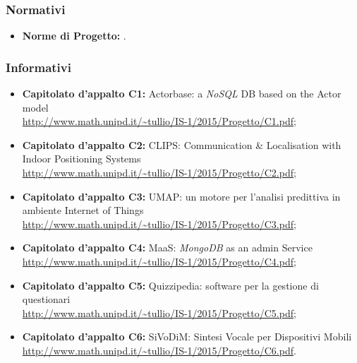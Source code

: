 \subsubsection{Normativi}
\begin{itemize}
\item \textbf{Norme di Progetto:} \textit{\NdP}.
\end{itemize}

\subsubsection{Informativi}
\begin{itemize}
\item \textbf{Capitolato d'appalto C1:} Actorbase: a \textit{NoSQL} DB based on the Actor model
\\\url{http://www.math.unipd.it/~tullio/IS-1/2015/Progetto/C1.pdf};
\item \textbf{Capitolato d'appalto C2:} CLIPS: Communication \& Localisation with Indoor Positioning Systems
\\\url{http://www.math.unipd.it/~tullio/IS-1/2015/Progetto/C2.pdf};
\item \textbf{Capitolato d'appalto C3:} UMAP: un motore per l'analisi predittiva in ambiente Internet of Things
\\\url{http://www.math.unipd.it/~tullio/IS-1/2015/Progetto/C3.pdf};
\item \textbf{Capitolato d'appalto C4:} MaaS: \textit{MongoDB} as an admin Service
\\\url{http://www.math.unipd.it/~tullio/IS-1/2015/Progetto/C4.pdf};
\item \textbf{Capitolato d'appalto C5:} Quizzipedia: software per la gestione di questionari
\\\url{http://www.math.unipd.it/~tullio/IS-1/2015/Progetto/C5.pdf};
\item \textbf{Capitolato d'appalto C6:} SiVoDiM: Sintesi Vocale per Dispositivi Mobili
\\\url{http://www.math.unipd.it/~tullio/IS-1/2015/Progetto/C6.pdf}.
\end{itemize}
